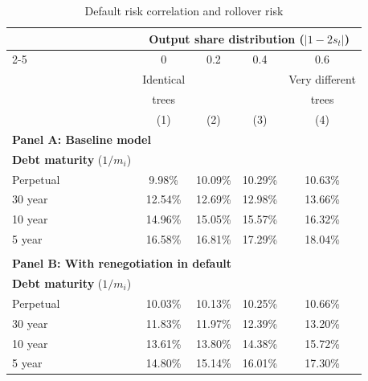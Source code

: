 \begin{table}[h]
\small
\centering
\caption{Default risk correlation and rollover risk}
\label{tab:table_corr_by_maturity}
\begin{tabular*}{\textwidth}{@{\extracolsep{\fill}}lcccc}
\toprule
 & \multicolumn{4}{c}{\textbf{Output share distribution} ($|1-2s_t|$)} \\
\cmidrule{2-5}
  & 0 & 0.2 & 0.4 & 0.6  \\
  & Identical & &  & Very different \\
    & trees & &  & trees \\
    \addlinespace
 & (1) & (2) & (3) & (4)
\\
\multicolumn{5}{l}{\textbf{Panel A: Baseline model}} \\
\midrule
\textbf{Debt maturity} ($1/m_i$) & & & & \\
\multicolumn{1}{l}{Perpetual} & 9.98\% & 10.09\% & 10.29\% & 10.63\% \\
\multicolumn{1}{l}{30 year} & 12.54\% & 12.69\% & 12.98\% & 13.66\% \\
\multicolumn{1}{l}{10 year} & 14.96\% & 15.05\% & 15.57\% & 16.32\% \\
\multicolumn{1}{l}{5 year} & 16.58\% & 16.81\% & 17.29\% & 18.04\% \\
\\
\multicolumn{5}{l}{\textbf{Panel B: With renegotiation in default}} \\
\midrule
\textbf{Debt maturity} ($1/m_i$) & & & & \\
\multicolumn{1}{l}{Perpetual} & 10.03\% & 10.13\% & 10.25\% & 10.66\% \\
\multicolumn{1}{l}{30 year} & 11.83\% & 11.97\% & 12.39\% & 13.20\% \\
\multicolumn{1}{l}{10 year} & 13.61\% & 13.80\% & 14.38\% & 15.72\% \\
\multicolumn{1}{l}{5 year} & 14.80\% & 15.14\% & 16.01\% & 17.30\% \\
\bottomrule
\end{tabular*}
\end{table}
